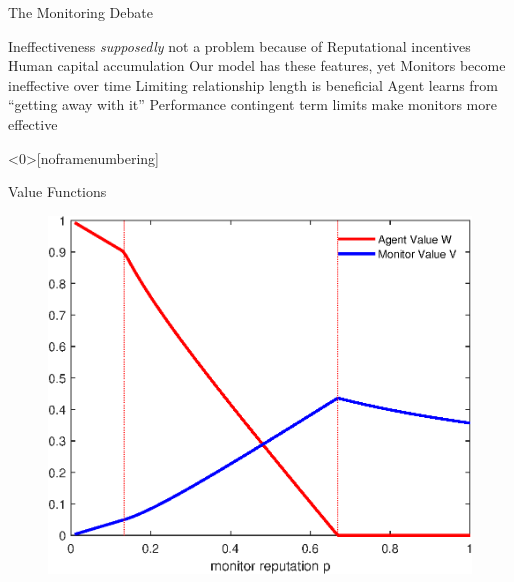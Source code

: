 \documentclass[usenames,dvipsnames]{beamer}
\newcommand{\bo}{\begin{outline}}
\newcommand{\eo}{\end{outline}}
\begin{document}
\begin{frame}{The Monitoring Debate}
\bo
\1 Ineffectiveness {\em supposedly} not a problem because of
\2 Reputational incentives 
\2 Human capital accumulation
\1 Our model has these features, yet
\2 Monitors become ineffective over time
\2 Limiting relationship length is beneficial
\1 Agent learns from ``getting away with it''
\1 Performance contingent term limits make monitors more effective
\eo
\end{frame}
%
%

\begin{frame}<0>[noframenumbering]


\end{frame}
\begin{frame}{Value Functions}\label{frame:ValueFunctions}
\begin{figure}[tbp]
        \includegraphics[scale=.6]{fig-eq-presentation.eps}
\end{figure}
\hfill \hyperlink{frame:Prop1}{}
\end{frame}
\end{document}
